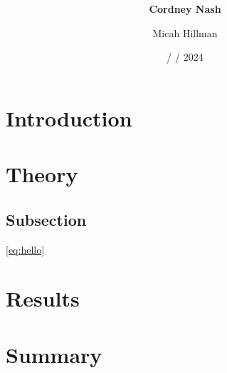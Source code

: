 \documentclass[a4paper,12pt,english]{all-in-one} %
\title{{\large\textit{}}\\[0.5cm]{\Huge\color{gray}\textsc{\@docsubtitle}}}
\author{\textbf{Cordney Nash}  \and Micah Hillman  }
\date{/ / 2024}
\begin{document}
\begin{titlepage}
\maketitle\vfill
\end{titlepage}
\newpage


\section*{Introduction}
\lipsum[1]


\begin{multicols}{2}

\section*{Theory}

    \subsection*{Subsection}
    \lipsum[4-8] \eqref{eq:hello}
    
\section*{Results}
    \lipsum[10-13]

\end{multicols}

\section*{Summary}
        \lipsum[14]
        \lipsum[15]
\end{document}
